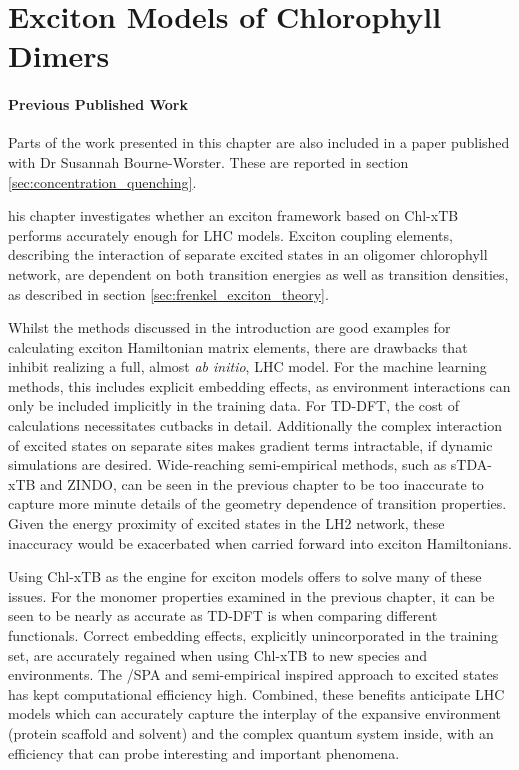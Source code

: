 %
%
\let\textcircled=\pgftextcircled
\chapter{Exciton Models of Chlorophyll Dimers}
\label{chap:excitons}

\subsubsection*{Previous Published Work}
Parts of the work presented in this chapter are also included in a paper published 
with Dr Susannah Bourne-Worster. These are reported in section \ref{sec:concentration_quenching}.


his chapter investigates whether an exciton framework based on Chl-xTB
performs accurately enough for LHC models. Exciton coupling elements, describing the
interaction of separate excited states in an oligomer chlorophyll network, are dependent
on both transition energies as well as transition densities, as described in section
\ref{sec:frenkel_exciton_theory}.

Whilst the methods discussed in the introduction are good examples for calculating exciton
Hamiltonian matrix elements, there are drawbacks that inhibit realizing a full,
almost \emph{ab initio}, LHC model. For the machine learning methods, this includes
explicit embedding effects, as environment interactions can only be included implicitly
in the training data. For TD-DFT, the cost of calculations necessitates cutbacks
in detail. Additionally the complex interaction of excited states on separate sites
makes gradient terms intractable, \cite{Stross2016} if dynamic simulations are desired.
Wide-reaching semi-empirical methods, such as sTDA-xTB and ZINDO, can be seen in
the previous chapter to be too inaccurate to capture more minute details of the 
geometry dependence of \Qy transition properties. Given the energy proximity of 
excited states in the LH2 network, these inaccuracy would be exacerbated when carried
forward into exciton Hamiltonians.

Using Chl-xTB as the engine for exciton models offers to solve many of these issues.
For the monomer properties examined in the previous chapter, it can be seen to be
nearly as accurate as TD-DFT is when comparing different functionals. Correct embedding 
effects, explicitly unincorporated in the training set, are accurately regained
when using Chl-xTB to new species and environments. The \dscf/SPA and semi-empirical 
inspired approach to excited states has kept computational efficiency high. Combined,
these benefits anticipate LHC models which can accurately capture the interplay
of the expansive environment (protein scaffold and solvent) and the complex quantum
system inside, with an efficiency that can probe interesting and important phenomena.

